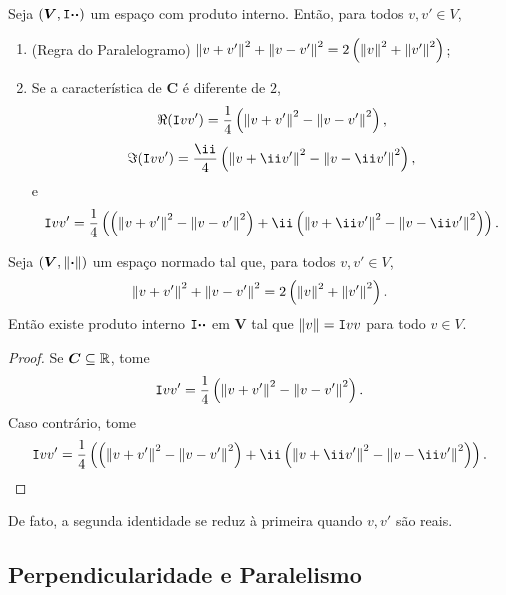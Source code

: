 \begin{prop}
Seja $(\bm V,\mathtt I{\bm{\cdot}}{\bm{\cdot}})$ um espaço com produto interno. Então, para todos $v,v' \in V$,
	\begin{enumerate}
	\item (Regra do Paralelogramo) $\left\Vert{v+v'}\right\Vert^2+\left\Vert{v-v'}\right\Vert^2 = 2\left( \left\Vert{v}\right\Vert^2 + \left\Vert{v'}\right\Vert^2 \right)$;

	\item Se a característica de $\bm C$ é diferente de $2$,
		\begin{equation*}
		\Re(\mathtt I{v}{v'}) = \frac{1}{4}\left(\left\Vert{v+v'}\right\Vert^2 - \left\Vert{v-v'}\right\Vert^2\right),
		\end{equation*}
		\begin{equation*}
		\Im(\inte{v}{v'}) = \frac{\ii}{4}\left(\nor{v+\ii v'}^2 - \nor{v-\ii v'}^2\right),
		\end{equation*}
e
		\begin{equation*}
		\inte{v}{v'} = \frac{1}{4} \left( \left(\nor{v+v'}^2 - \nor{v-v'}^2\right) + \ii \left(\nor{v+\ii v'}^2 - \nor{v-\ii v'}^2\right) \right).
		\end{equation*}
	\end{enumerate}
\end{prop}



\begin{prop}[Polarização]
Seja $(\bm V,\left\Vert{\bm{\cdot}}\right\Vert)$ um espaço normado tal que, para todos $v,v' \in V$,
	\begin{equation*}
	\left\Vert{v+v'}\right\Vert^2+\left\Vert{v-v'}\right\Vert^2 = 2\left( \left\Vert{v}\right\Vert^2 + \left\Vert{v'}\right\Vert^2 \right).
	\end{equation*}
Então existe produto interno $\mathtt I{\bm{\cdot}}{\bm{\cdot}}$ em $\bm V$ tal que $\left\Vert{v}\right\Vert=\mathtt I{v}{v}$ para todo $v \in V$.
\end{prop}
\begin{proof}
Se $\bm C \subseteq \mathbb{R}$, tome
	\begin{equation*}
	\mathtt I{v}{v'} = \frac{1}{4}\left(\left\Vert{v+v'}\right\Vert^2 - \left\Vert{v-v'}\right\Vert^2\right).
	\end{equation*}
Caso contrário, tome
	\begin{equation*}
	\inte{v}{v'} = \frac{1}{4}\left(\left(\nor{v+v'}^2 - \nor{v-v'}^2\right) + \ii \left(\nor{v+\ii v'}^2 - \nor{v-\ii v'}^2\right)\right). \qedhere
	\end{equation*}
\end{proof}

De fato, a segunda identidade se reduz à primeira quando $v,v'$ são reais.	

\subsection{Perpendicularidade e Paralelismo}

